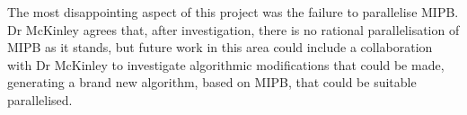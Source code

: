 The most disappointing aspect of this project was the failure to parallelise MIPB. Dr McKinley agrees that, after investigation, there is no rational parallelisation of MIPB as it stands, but future work in this area could include a collaboration with Dr McKinley to investigate algorithmic modifications that could be made, generating a brand new algorithm, based on MIPB, that could be suitable parallelised.
